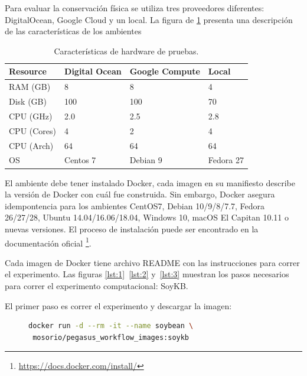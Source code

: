 Para evaluar la conservación física se utiliza tres proveedores diferentes: DigitalOcean, Google Cloud y un local. La figura de \ref{image-env} presenta una descripción de las características de los ambientes    

\begin{table}[t]
\centering
\begin{tabular}{|l|l|l|l|}
\hline
Resource   & Digital Ocean & Google Compute & Local     \\ \hline
RAM (GB)   & 8             & 8              & 4         \\ \hline
Disk (GB)  & 100           & 100            & 70        \\ \hline
CPU (GHz)  & 2.0           & 2.5            & 2.8          \\ \hline
CPU (Cores)& 4             & 2              & 4          \\ \hline
CPU (Arch) & 64            & 64             & 64        \\ \hline
OS         & Centos 7      & Debian 9       & Fedora 27 \\ \hline
\end{tabular}
\caption{Características de hardware de pruebas.}
\label{image-env}
\end{table}

El ambiente debe tener instalado Docker, cada imagen en su manifiesto describe la versión de Docker con cuál fue construida. Sin embargo, Docker asegura idempontencia para los ambientes CentOS7, Debian 10/9/8/7.7, Fedora 26/27/28, Ubuntu 14.04/16.06/18.04, Windows 10, macOS El Capitan 10.11 o nuevas versiones.
El proceso de instalación puede ser encontrado en la documentación oficial \footnote{\url{https://docs.docker.com/install/}}.

Cada imagen de Docker tiene archivo README con las instrucciones para correr el experimento. Las figuras \ref{lst:1}~\ref{lst:2} y~\ref{lst:3}  muestran los pasos necesarios para correr el experimento computacional: SoyKB. 

El primer paso es correr el experimento y descargar la imagen:
\begin{figure}[ht]
\begin{lstlisting}[caption={Descargar y correr la imagen disponible en DockerHub mosorio/pegasus\_workflow\_images:soykb},label={lst:1},language=bash]
docker run -d --rm -it --name soybean \
 mosorio/pegasus_workflow_images:soykb
\end{lstlisting}	
\end{figure}


